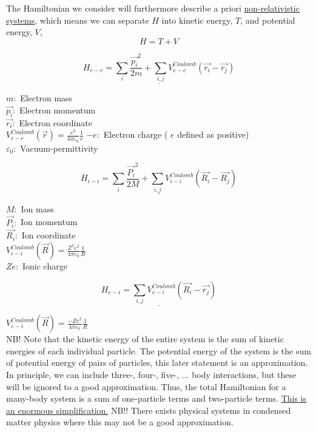 \noindent The Hamiltonian we consider will furthermore describe a priori \uline{non-relativistic systems}, which means we can separate $H$ into kinetic energy, $T$, and potential energy, $V$,
\begin{equation}
	H = T+V
\end{equation}

\begin{equation}
	\underline{H_{e-e}= \sum_{i} \frac{\vec{p_i}^2}{2m}+ \sum_{i,j} V_{e-e}^{Coulomb} (\vec{r_i}-\vec{r_j})}
\end{equation}

\noindent $m:$ Electron mass\\
$\vec{p_i}:$ Electron momentum\\
$\vec{r_i}:$ Electron coordinate\\
$V_{e-e}^{Coulomb}(\vec{r})= \frac{e^2}{4\pi \varepsilon_0} \frac{1}{r}$
$-e:$ Electron charge ( $e$ defined as positive)\\
$\varepsilon_0:$ Vacuum-permittivity 

\begin{equation}
	\underline{H_{i-i}= \sum_{i} \frac{\vec{P_i}^2}{2M}+ \sum_{i,j} V_{i-i}^{Coulomb} (\vec{R_i}-\vec{R_j})}
\end{equation}

\noindent $M:$ Ion mass\\
$\vec{P_i}:$ Ion momentum\\
$\vec{R_i}:$ Ion coordinate\\
$V_{i-i}^{Coulomb}(\vec{R})= \frac{Z^2e^2}{4\pi \varepsilon_0} \frac{1}{R}$\\
$Ze:$ Ionic charge

\begin{equation}
\underline{H_{e-i}= \sum_{i,j} V_{e-i}^{Coulomb} (\vec{R_i}-\vec{r_j})}
\end{equation}

\noindent $V_{e-i}^{Coulomb}(\vec{R})= \frac{-Ze^2}{4\pi \varepsilon_0} \frac{1}{R}$\\

\noindent NB! Note that the kinetic energy of the entire system is the sum of kinetic energies of each individual particle. The potential energy of the system is the sum of potential energy of pairs of particles, this later statement is an approximation. In principle, we can include three-, four-, five-, ... body interactions, but these will be ignored to a good approximation.
Thus, the total Hamiltonian for a many-body system is a sum of one-particle terms and two-particle terms. \uline{This is an enormous simplification.} NB!! There exists physical systems in condensed matter physics where this may not be a good approximation.\\
\linebreak



